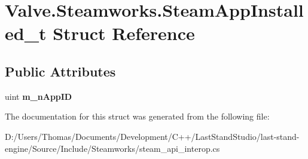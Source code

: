 \hypertarget{structValve_1_1Steamworks_1_1SteamAppInstalled__t}{}\section{Valve.\+Steamworks.\+Steam\+App\+Installed\+\_\+t Struct Reference}
\label{structValve_1_1Steamworks_1_1SteamAppInstalled__t}
\subsection*{Public Attributes}
\begin{DoxyCompactItemize}
\item 
\hypertarget{structValve_1_1Steamworks_1_1SteamAppInstalled__t_a87cb78d72b675231b3b885bc46476933}{}uint {\bfseries m\+\_\+n\+App\+I\+D}\label{structValve_1_1Steamworks_1_1SteamAppInstalled__t_a87cb78d72b675231b3b885bc46476933}

\end{DoxyCompactItemize}


The documentation for this struct was generated from the following file\+:\begin{DoxyCompactItemize}
\item 
D\+:/\+Users/\+Thomas/\+Documents/\+Development/\+C++/\+Last\+Stand\+Studio/last-\/stand-\/engine/\+Source/\+Include/\+Steamworks/steam\+\_\+api\+\_\+interop.\+cs\end{DoxyCompactItemize}

